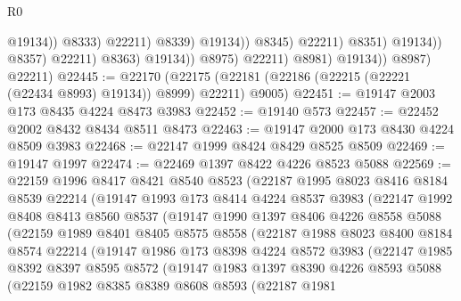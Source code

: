 \begin{lexlean}{R0}
\begin{coremodule}
                                                    @19134))
                                                @8333)
                                              @22211)
                                            @8339)
                                          @19134))
                                      @8345)
                                    @22211)
                                  @8351)
                                @19134))
                            @8357)
                          @22211)
                        @8363)
                      @19134))
                  @8975)
                @22211)
              @8981)
            @19134))
        @8987)
      @22211)
@22445 := @22170
    (@22175 (@22181 (@22186 (@22215 (@22221 (@22434 @8993) @19134)) @8999) @22211) @9005)
@22451 := @19147 @2003 @173 @8435 @4224 @8473 @3983
@22452 := @19140 @573
@22457 := @22452 @2002 @8432 @8434 @8511 @8473
@22463 := @19147 @2000 @173 @8430 @4224 @8509 @3983
@22468 := @22147 @1999 @8424 @8429 @8525 @8509
@22469 := @19147 @1997
@22474 := @22469 @1397 @8422 @4226 @8523 @5088
@22569 := @22159
    @1996
    @8417
    @8421
    @8540
    @8523
    (@22187
      @1995
      @8023
      @8416
      @8184
      @8539
      @22214
      (@19147
        @1993
        @173
        @8414
        @4224
        @8537
        @3983
        (@22147
          @1992
          @8408
          @8413
          @8560
          @8537
          (@19147
            @1990
            @1397
            @8406
            @4226
            @8558
            @5088
            (@22159
              @1989
              @8401
              @8405
              @8575
              @8558
              (@22187
                @1988
                @8023
                @8400
                @8184
                @8574
                @22214
                (@19147
                  @1986
                  @173
                  @8398
                  @4224
                  @8572
                  @3983
                  (@22147
                    @1985
                    @8392
                    @8397
                    @8595
                    @8572
                    (@19147
                      @1983
                      @1397
                      @8390
                      @4226
                      @8593
                      @5088
                      (@22159
                        @1982
                        @8385
                        @8389
                        @8608
                        @8593
                        (@22187
                          @1981

\end{coremodule}
\end{lexlean}
